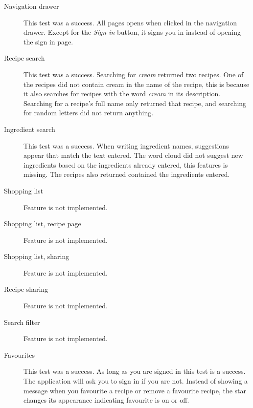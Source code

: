 \begin{description}
\item[Navigation drawer] This test was a success. All pages opens when clicked in the navigation drawer. Except for the \textit{Sign in} button, it signs you in instead of opening the sign in page.
\item[Recipe search] This test was a success. Searching for \textit{cream} returned two recipes. One of the recipes did not contain cream in the name of the recipe, this is because it also searches for recipes with the word \textit{cream} in its description. Searching for a recipe's full name only returned that recipe, and searching for random letters did not return anything.
\item[Ingredient search] This test was a success. When writing ingredient names, suggestions appear that match the text entered. The word cloud did not suggest new ingredients based on the ingredients already entered, this features is missing. The recipes also returned contained the ingredients entered.
\item[Shopping list] Feature is not implemented.
\item[Shopping list, recipe page] Feature is not implemented.
\item[Shopping list, sharing] Feature is not implemented.
\item[Recipe sharing] Feature is not implemented.
\item[Search filter] Feature is not implemented.
\item[Favourites] This test was a success. As long as you are signed in this test is a success. The application will ask you to sign in if you are not. Instead of showing a message when you favourite a recipe or remove a favourite recipe, the star changes its appearance indicating favourite is on or off.
\end{description}